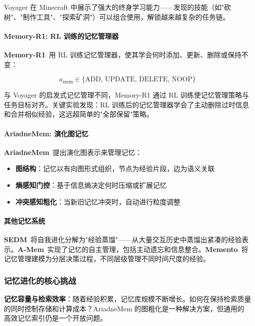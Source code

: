 Voyager 在 Minecraft 中展示了强大的终身学习能力——发现的技能（如"砍树"、"制作工具"、"探索矿洞"）可以组合使用，解锁越来越复杂的任务链。

\paragraph{Memory-R1: RL 训练的记忆管理器}

\textbf{Memory-R1}~\citep{memoryr1_2025}用 RL 训练记忆管理器，使其学会何时添加、更新、删除或保持不变：

\begin{equation}
a_{\mathrm{mem}} \in \{\text{ADD, UPDATE, DELETE, NOOP}\}
\label{eq:memr1-actions}
\end{equation}

与 Voyager 的启发式记忆管理不同，Memory-R1 通过 RL 训练使记忆管理策略与任务目标对齐。关键实验发现：RL 训练后的记忆管理器学会了主动删除过时信息和合并相似经验，这远超简单的"全部保留"策略。

\paragraph{AriadneMem: 演化图记忆}

\textbf{AriadneMem}~\citep{ariadnemem2025}提出演化图表示来管理记忆：
\begin{itemize}
\item \textbf{图结构}：记忆以有向图形式组织，节点为经验片段，边为语义关联
\item \textbf{熵感知门控}：基于信息熵决定何时压缩或扩展记忆
\item \textbf{冲突感知粗化}：当新旧记忆冲突时，自动进行粒度调整
\end{itemize}

\paragraph{其他记忆系统}

\textbf{SEDM}~\citep{sedm2024}将自我进化分解为"经验蒸馏"——从大量交互历史中蒸馏出紧凑的经验表示。\textbf{A-Mem}~\citep{amem2024}实现了记忆的自主管理，包括主动遗忘和信息整合。\textbf{Memento}~\citep{memento2024}将记忆管理建模为分层决策过程，不同层级管理不同时间尺度的经验。

\subsubsection{记忆进化的核心挑战}

\textbf{记忆容量与检索效率}：随着经验积累，记忆库规模不断增长。如何在保持检索质量的同时控制存储和计算成本？AriadneMem 的图粗化是一种解决方案，但通用的高效记忆索引仍是一个开放问题。

